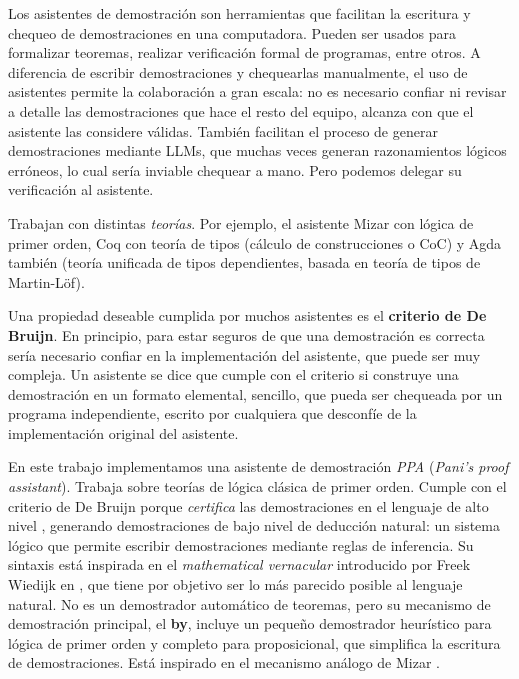 Los asistentes de demostración son herramientas que facilitan la escritura y chequeo de demostraciones en una computadora. Pueden ser usados para formalizar teoremas, realizar verificación formal de programas, entre otros. A diferencia de escribir demostraciones y chequearlas manualmente, el uso de asistentes permite la colaboración a gran escala: no es necesario confiar ni revisar a detalle las demostraciones que hace el resto del equipo, alcanza con que el asistente las considere válidas. También facilitan el proceso de generar demostraciones mediante LLMs, que muchas veces generan razonamientos lógicos erróneos, lo cual sería inviable chequear a mano. Pero podemos delegar su verificación al asistente.

Trabajan con distintas \textit{teorías}. Por ejemplo, el asistente Mizar con lógica de primer orden, Coq con teoría de tipos (cálculo de construcciones o CoC) y Agda también (teoría unificada de tipos dependientes, basada en teoría de tipos de Martin-Löf).

Una propiedad deseable cumplida por muchos asistentes es el \textbf{criterio de De Bruijn}. En principio, para estar seguros de que una demostración es correcta sería necesario confiar en la implementación del asistente, que puede ser muy compleja. Un asistente se dice que cumple con el criterio si construye una demostración en un formato elemental, sencillo, que pueda ser chequeada por un programa independiente, escrito por cualquiera que desconfíe de la implementación original del asistente.

En este trabajo implementamos una asistente de demostración \textit{PPA}
(\textit{Pani's proof assistant}). Trabaja sobre teorías de lógica clásica de
primer orden. Cumple con el criterio de De Bruijn porque \textit{certifica} las
demostraciones en el lenguaje de alto nivel \ppaLang{}, generando demostraciones
de bajo nivel de deducción natural: un sistema lógico que permite escribir
demostraciones mediante reglas de inferencia. Su sintaxis está inspirada en el
\textit{mathematical vernacular} introducido por Freek Wiedijk en
\cite{freek-mv}, que tiene por objetivo ser lo más parecido posible al lenguaje
natural. No es un demostrador automático de teoremas, pero su mecanismo de
demostración principal, el \textbf{by}, incluye un pequeño demostrador
heurístico para lógica de primer orden y completo para proposicional, que
simplifica la escritura de demostraciones. Está inspirado en el mecanismo análogo de Mizar \cite{freek-by}.

